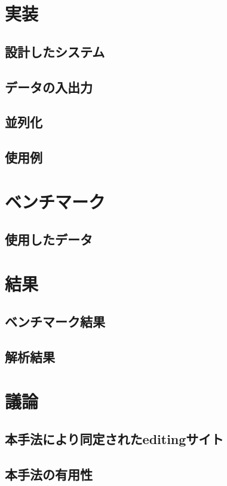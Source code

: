 \section{実装}
\subsection{設計したシステム}
\subsection{データの入出力}
\subsection{並列化}
\subsection{使用例}

\section{ベンチマーク}
\subsection{使用したデータ}

\section{結果}
\subsection{ベンチマーク結果}
\subsection{解析結果}

\section{議論}
\subsection{本手法により同定されたeditingサイト}
\subsection{本手法の有用性}



